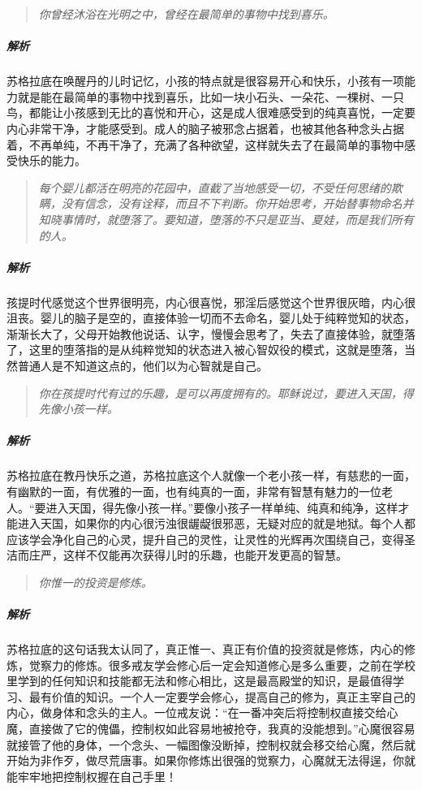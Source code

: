 \begin{quote}\it
    你曾经沐浴在光明之中，曾经在最简单的事物中找到喜乐。
\end{quote}

\subparagraph{解析} 苏格拉底在唤醒丹的儿时记忆，小孩的特点就是很容易开心和快乐，小孩有一项能力就是能在最简单的事物中找到喜乐，比如一块小石头、一朵花、一棵树、一只鸟，都能让小孩感到无比的喜悦和开心，这是成人很难感受到的纯真喜悦，一定要内心非常干净，才能感受到。成人的脑子被邪念占据着，也被其他各种念头占据着，不再单纯，不再干净了，充满了各种欲望，这样就失去了在最简单的事物中感受快乐的能力。

\begin{quote}\it
    每个婴儿都活在明亮的花园中，直截了当地感受一切，不受任何思绪的欺瞒，没有信念，没有诠释，而且不下判断。你开始思考，开始替事物命名并知晓事情时，就堕落了。要知道，堕落的不只是亚当、夏娃，而是我们所有的人。
\end{quote}

\subparagraph{解析} 孩提时代感觉这个世界很明亮，内心很喜悦，邪淫后感觉这个世界很灰暗，内心很沮丧。婴儿的脑子是空的，直接体验一切而不去命名，婴儿处于纯粹觉知的状态，渐渐长大了，父母开始教他说话、认字，慢慢会思考了，失去了直接体验，就堕落了，这里的堕落指的是从纯粹觉知的状态进入被心智奴役的模式，这就是堕落，当然普通人是不知道这点的，他们以为心智就是自己。

\begin{quote}\it
    你在孩提时代有过的乐趣，是可以再度拥有的。耶稣说过，要进入天国，得先像小孩一样。
\end{quote}

\subparagraph{解析} 苏格拉底在教丹快乐之道，苏格拉底这个人就像一个老小孩一样，有慈悲的一面，有幽默的一面，有优雅的一面，也有纯真的一面，非常有智慧有魅力的一位老人。“要进入天国，得先像小孩一样。”要像小孩子一样单纯、纯真和纯净，这样才能进入天国，如果你的内心很污浊很龌龊很邪恶，无疑对应的就是地狱。每个人都应该学会净化自己的心灵，提升自己的灵性，让灵性的光辉再次围绕自己，变得圣洁而庄严，这样不仅能再次获得儿时的乐趣，也能开发更高的智慧。

\begin{quote}\it
    你惟一的投资是修炼。
\end{quote}

\subparagraph{解析} 苏格拉底的这句话我太认同了，真正惟一、真正有价值的投资就是修炼，内心的修炼，觉察力的修炼。很多戒友学会修心后一定会知道修心是多么重要，之前在学校里学到的任何知识和技能都无法和修心相比，这是最高殿堂的知识，是最值得学习、最有价值的知识。一个人一定要学会修心，提高自己的修为，真正主宰自己的内心，做身体和念头的主人。一位戒友说：“在一番冲突后将控制权直接交给心魔，直接做了它的傀儡，控制权如此容易地被抢夺，我真的没能想到。”心魔很容易就接管了他的身体，一个念头、一幅图像没断掉，控制权就会移交给心魔，然后就开始为非作歹，做尽荒唐事。如果你修炼出很强的觉察力，心魔就无法得逞，你就能牢牢地把控制权握在自己手里！

